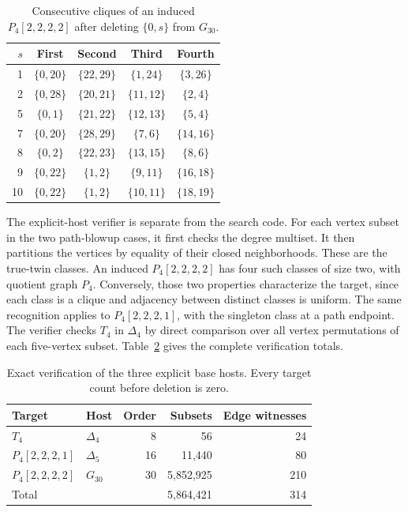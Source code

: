 \documentclass[11pt,reqno]{amsart}
\theoremstyle{definition}
\theoremstyle{remark}
\begin{document}
\begin{table}[htbp]
\centering
\caption{Consecutive cliques of an induced $P_4[2,2,2,2]$ after deleting $\{0,s\}$ from $G_{30}$.}\label{tab:circulant}
\begin{tabular}{rcccc}\toprule
$s$ & First & Second & Third & Fourth\\\midrule
1 & $\{0,20\}$ & $\{22,29\}$ & $\{1,24\}$ & $\{3,26\}$\\
2 & $\{0,28\}$ & $\{20,21\}$ & $\{11,12\}$ & $\{2,4\}$\\
5 & $\{0,1\}$ & $\{21,22\}$ & $\{12,13\}$ & $\{5,4\}$\\
7 & $\{0,20\}$ & $\{28,29\}$ & $\{7,6\}$ & $\{14,16\}$\\
8 & $\{0,2\}$ & $\{22,23\}$ & $\{13,15\}$ & $\{8,6\}$\\
9 & $\{0,22\}$ & $\{1,2\}$ & $\{9,11\}$ & $\{16,18\}$\\
10 & $\{0,22\}$ & $\{1,2\}$ & $\{10,11\}$ & $\{18,19\}$\\\bottomrule
\end{tabular}
\end{table}

The explicit-host verifier is separate from the search code. For each vertex subset in the two path-blowup cases, it first checks the degree multiset. It then partitions the vertices by equality of their closed neighborhoods. These are the true-twin classes. An induced $P_4[2,2,2,2]$ has four such classes of size two, with quotient graph $P_4$. Conversely, those two properties characterize the target, since each class is a clique and adjacency between distinct classes is uniform. The same recognition applies to $P_4[2,2,2,1]$, with the singleton class at a path endpoint. The verifier checks $T_4$ in $\Delta_4$ by direct comparison over all vertex permutations of each five-vertex subset. Table~\ref{tab:hosts} gives the complete verification totals.

\begin{table}[htbp]
\centering
\caption{Exact verification of the three explicit base hosts. Every target count before deletion is zero.}\label{tab:hosts}
\begin{tabular}{@{}llrrr@{}}\toprule
Target & Host & Order & Subsets & Edge witnesses\\\midrule
$T_4$ & $\Delta_4$ & 8 & 56 & 24\\
$P_4[2,2,2,1]$ & $\Delta_5$ & 16 & 11,440 & 80\\
$P_4[2,2,2,2]$ & $G_{30}$ & 30 & 5,852,925 & 210\\\midrule
\multicolumn{3}{l}{Total} & 5,864,421 & 314\\\bottomrule
\end{tabular}
\end{table}
\end{document}
